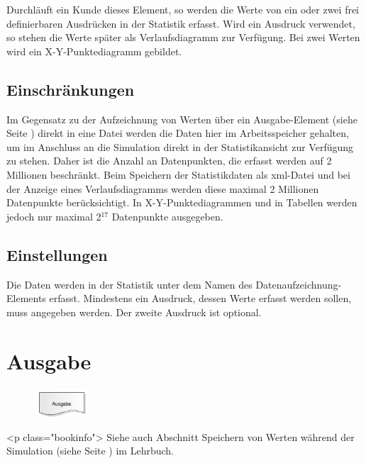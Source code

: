 Durchläuft ein Kunde dieses Element, so werden die Werte von ein oder zwei frei definierbaren Ausdrücken
in der Statistik erfasst. Wird ein Ausdruck verwendet, so stehen die Werte später als Verlaufsdiagramm
zur Verfügung. Bei zwei Werten wird ein X-Y-Punktediagramm gebildet.

\subsection*{Einschränkungen}

Im Gegensatz zu der Aufzeichnung von Werten über ein Ausgabe-Element (siehe Seite \pageref{ref:ModelElementOutput}) 
direkt in eine Datei werden die Daten hier im Arbeitsspeicher gehalten, um im Anschluss an die Simulation
direkt in der Statistikansicht zur Verfügung zu stehen. Daher ist die Anzahl an Datenpunkten, die erfasst
werden auf 2 Millionen beschränkt. Beim Speichern der Statistikdaten als xml-Datei und bei der Anzeige eines
Verlaufsdiagramms werden diese maximal 2 Millionen Datenpunkte berücksichtigt. In X-Y-Punktediagrammen und
in Tabellen werden jedoch nur maximal 2$^{17}$ Datenpunkte ausgegeben.

\subsection*{Einstellungen}

Die Daten werden in der Statistik unter dem Namen des Datenaufzeichnung-Elements erfasst. Mindestens
ein Ausdruck, dessen Werte erfasst werden sollen, muss angegeben werden. Der zweite Ausdruck ist
optional.


\section{Ausgabe}
\label{ref:ModelElementOutput}

\begin{figure}
\vspace{-22pt}
\includegraphics[width=2cm]{imageModelElementOutput.png}
\vspace{-22pt}
\end{figure}

<p class="bookinfo">
Siehe auch Abschnitt Speichern von Werten während der Simulation (siehe Seite \pageref{ref:book:9.3.3}) im Lehrbuch.

